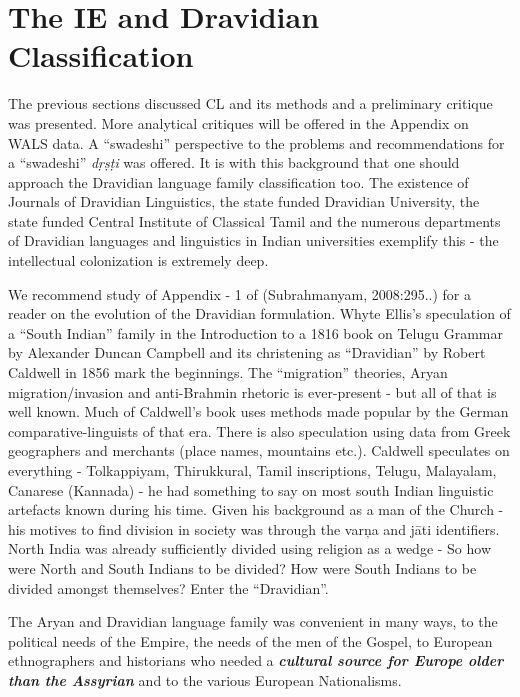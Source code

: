 \section*{The IE and Dravidian Classification}

The previous sections discussed CL and its methods and a preliminary critique was presented. More analytical critiques will be offered in the Appendix on WALS data. A “swadeshi” perspective to the problems and recommendations for a “swadeshi” \textit{dṛṣṭi} was offered. It is with this background that one should approach the Dravidian language family classification too. The existence of Journals of Dravidian Linguistics, the state funded Dravidian University, the state funded Central Institute of Classical Tamil and the numerous departments of Dravidian languages and linguistics in Indian universities exemplify this - the intellectual colonization is extremely deep.

We recommend study of Appendix - 1 of (Subrahmanyam, 2008:295..) for a reader on the evolution of the Dravidian formulation. Whyte Ellis’s speculation of a “South Indian” family in the Introduction to a 1816 book on Telugu Grammar by Alexander Duncan Campbell and its christening as “Dravidian” by Robert Caldwell in 1856 mark the beginnings. The “migration” theories, Aryan migration/invasion and anti-Brahmin rhetoric is ever-present - but all of that is well known. Much of Caldwell’s book uses methods made popular by the German comparative-linguists of that era. There is also speculation using data from Greek geographers and merchants (place names, mountains etc.). Caldwell speculates on everything - Tolkappiyam, Thirukkural, Tamil inscriptions, Telugu, Malayalam, Canarese (Kannada) - he had something to say on most south Indian linguistic artefacts known during his time. Given his background as a man of the Church - his motives to find division in society was through the varņa and jāti identifiers. North India was already sufficiently divided using religion as a wedge - So how were North and South Indians to be divided? How were South Indians to be divided amongst themselves? Enter the “Dravidian”.

The Aryan and Dravidian language family was convenient in many ways, to the political needs of the Empire, the needs of the men of the Gospel, to European ethnographers and historians who needed a \textbf{\textit{cultural source for Europe older than the Assyrian}} and to the various European Nationalisms.

